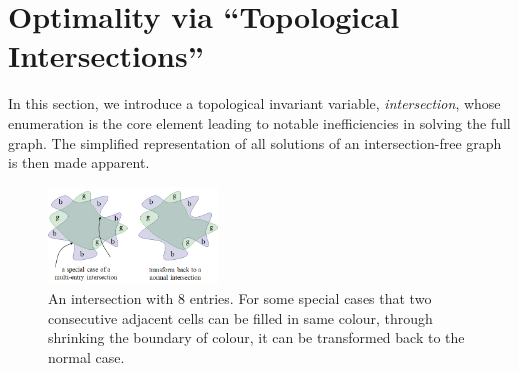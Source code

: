 \documentclass[journal]{IEEEtran}
\begin{document}
\section{Optimality via ``Topological Intersections''}
\label{section_intersection}
In this section, we introduce a topological invariant variable, \textit{intersection}, whose enumeration is the core element leading to notable inefficiencies in solving the full graph. The simplified representation of all solutions of an intersection-free graph is then made apparent.  


\begin{figure}[t]
\centering
\includegraphics[width = 0.4\textwidth]{figures/multi_entry}
\caption{An intersection with $8$ entries. For some special cases that two consecutive adjacent cells can be filled in same colour, through shrinking the boundary of colour, it can be transformed back to the normal case. }\label{fig:multi_entry}
\end{figure}
\end{document}
